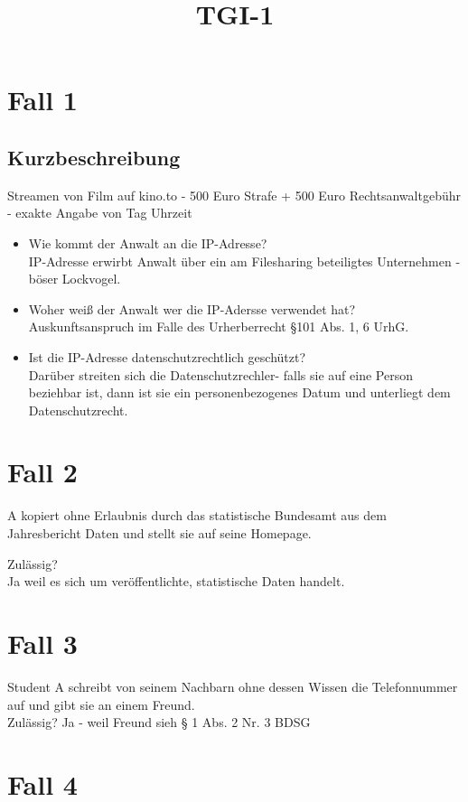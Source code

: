 \documentclass[a4paper,10pt]{scrartcl}
\title{TGI-1}
\author{}
\begin{document}
\section{Fall 1}

\subsection{Kurzbeschreibung}

Streamen von Film auf kino.to - 500 Euro Strafe + 500 Euro Rechtsanwaltgebühr - exakte Angabe von Tag Uhrzeit 

\begin{itemize}
 \item Wie kommt der Anwalt an die IP-Adresse?\\
 IP-Adresse erwirbt Anwalt über ein am Filesharing beteiligtes Unternehmen - böser Lockvogel.
 \item Woher weiß der Anwalt wer die IP-Adersse verwendet hat?\\
 Auskunftsanspruch im Falle des Urherberrecht §101 Abs. 1, 6 UrhG.
 \item Ist die IP-Adresse datenschutzrechtlich geschützt?\\
 Darüber streiten sich die Datenschutzrechler- falls sie auf
 eine Person beziehbar ist, dann ist sie ein personenbezogenes Datum
 und unterliegt dem Datenschutzrecht.
\end{itemize}

\section{Fall 2}

A kopiert ohne Erlaubnis durch das statistische Bundesamt aus dem Jahresbericht Daten und stellt
sie auf seine Homepage.

Zulässig?\\

Ja weil es sich um veröffentlichte, statistische Daten handelt.

\section{Fall 3}

Student A schreibt von seinem Nachbarn ohne dessen Wissen die Telefonnummer
auf und gibt sie an einem Freund.\\

Zulässig?
Ja - weil Freund sieh § 1 Abs. 2 Nr. 3 BDSG

\section{Fall 4}
\end{document}
